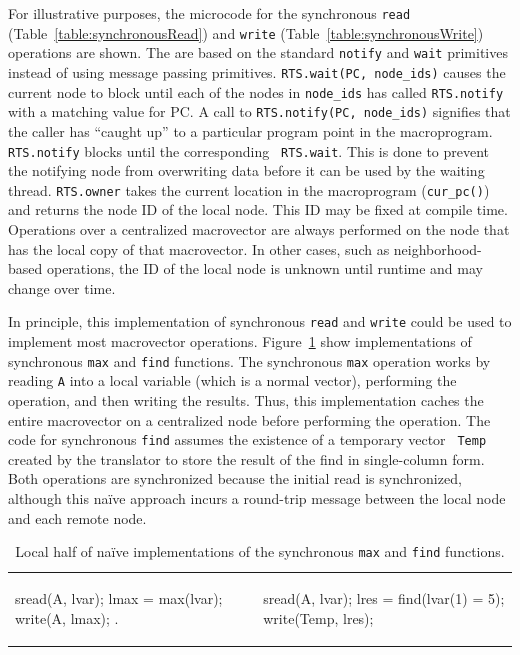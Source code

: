 For illustrative purposes, the microcode for the synchronous {\tt read}
(Table~\ref{table:synchronousRead}) and {\tt write}
(Table~\ref{table:synchronousWrite}) operations are shown. The are based on the
standard {\tt notify} and {\tt wait} primitives instead of using message passing
primitives.  {\tt RTS.wait(PC, node\_ids)} causes the current node to block
until each of the nodes in {\tt node\_ids} has called {\tt RTS.notify} with a
matching value for PC. A call to {\tt RTS.notify(PC, node\_ids)} signifies that
the caller has ``caught up'' to a particular program point in the
macroprogram. {\tt RTS.notify} blocks until the corresponding {\tt
RTS.wait}. This is done to prevent the notifying node from overwriting data
before it can be used by the waiting thread.  {\tt RTS.owner} takes the current
location in the macroprogram ({\tt cur\_pc()}) and returns the node ID of the
local node. This ID may be fixed at compile time. Operations over a centralized
macrovector are always performed on the node that has the local copy of that
macrovector. In other cases, such as neighborhood-based operations, the ID of
the local node is unknown until runtime and may change over time.

In principle, this implementation of synchronous {\tt read} and {\tt write}
could be used to implement most macrovector
operations. Figure~\ref{table:maxAndFind} show implementations of synchronous
{\tt max} and {\tt find} functions. The synchronous {\tt max} operation works by
reading {\tt A} into a local variable (which is a normal vector), performing the
operation, and then writing the results.  Thus, this implementation caches the
entire macrovector on a centralized node before performing the operation.  The
code for synchronous {\tt find} assumes the existence of a temporary vector {\tt
Temp} created by the translator to store the result of the find in single-column
form.  Both operations are synchronized because the initial read is
synchronized, although this na\"{i}ve approach incurs a round-trip message
between the local node and each remote node.

\begin{table}[!htb]
\begin{tabular}{l|ll}
{\begin{macrolab}
sread(A, lvar);
lmax = max(lvar);
write(A, lmax);
.
\end{macrolab}}
& ~ &
{\begin{macrolab}
sread(A, lvar); 
lres =
  find(lvar(1) = 5); 
write(Temp, lres);
\end{macrolab}}
\end{tabular}
\caption{Local half of na\"{i}ve implementations of the synchronous {\tt max} and
{\tt find} functions.}
\label{table:maxAndFind}
\end{table}

